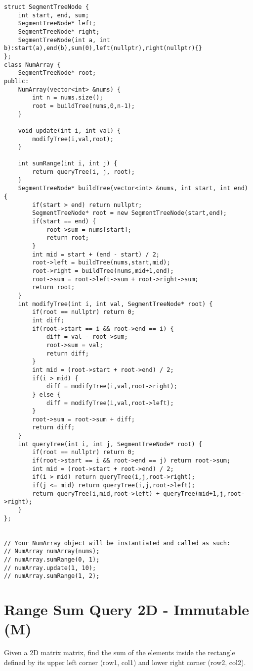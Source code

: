 \begin{lstlisting}
struct SegmentTreeNode {
    int start, end, sum;
    SegmentTreeNode* left;
    SegmentTreeNode* right;
    SegmentTreeNode(int a, int b):start(a),end(b),sum(0),left(nullptr),right(nullptr){}
};
class NumArray {
    SegmentTreeNode* root;
public:
    NumArray(vector<int> &nums) {
        int n = nums.size();
        root = buildTree(nums,0,n-1);
    }
   
    void update(int i, int val) {
        modifyTree(i,val,root);
    }

    int sumRange(int i, int j) {
        return queryTree(i, j, root);
    }
    SegmentTreeNode* buildTree(vector<int> &nums, int start, int end) {
        if(start > end) return nullptr;
        SegmentTreeNode* root = new SegmentTreeNode(start,end);
        if(start == end) {
            root->sum = nums[start];
            return root;
        }
        int mid = start + (end - start) / 2;
        root->left = buildTree(nums,start,mid);
        root->right = buildTree(nums,mid+1,end);
        root->sum = root->left->sum + root->right->sum;
        return root;
    }
    int modifyTree(int i, int val, SegmentTreeNode* root) {
        if(root == nullptr) return 0;
        int diff;
        if(root->start == i && root->end == i) {
            diff = val - root->sum;
            root->sum = val;
            return diff;
        }
        int mid = (root->start + root->end) / 2;
        if(i > mid) {
            diff = modifyTree(i,val,root->right);
        } else {
            diff = modifyTree(i,val,root->left);
        }
        root->sum = root->sum + diff;
        return diff;
    }
    int queryTree(int i, int j, SegmentTreeNode* root) {
        if(root == nullptr) return 0;
        if(root->start == i && root->end == j) return root->sum;
        int mid = (root->start + root->end) / 2;
        if(i > mid) return queryTree(i,j,root->right);
        if(j <= mid) return queryTree(i,j,root->left);
        return queryTree(i,mid,root->left) + queryTree(mid+1,j,root->right);
    }
};


// Your NumArray object will be instantiated and called as such:
// NumArray numArray(nums);
// numArray.sumRange(0, 1);
// numArray.update(1, 10);
// numArray.sumRange(1, 2);
\end{lstlisting}


\section{Range Sum Query 2D - Immutable (M)}
Given a 2D matrix matrix, find the sum of the elements inside the rectangle defined by its upper left corner (row1, col1) and lower right corner (row2, col2). \\

